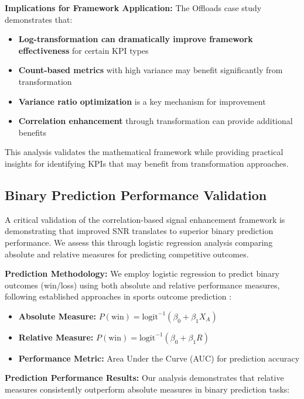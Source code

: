 \textbf{Implications for Framework Application:}
The Offloads case study demonstrates that:

\begin{itemize}
    \item \textbf{Log-transformation can dramatically improve framework effectiveness} for certain KPI types
    \item \textbf{Count-based metrics} with high variance may benefit significantly from transformation
    \item \textbf{Variance ratio optimization} is a key mechanism for improvement
    \item \textbf{Correlation enhancement} through transformation can provide additional benefits
\end{itemize}

This analysis validates the mathematical framework while providing practical insights for identifying KPIs that may benefit from transformation approaches.

\subsection{Binary Prediction Performance Validation}

A critical validation of the correlation-based signal enhancement framework is demonstrating that improved SNR translates to superior binary prediction performance. We assess this through logistic regression analysis comparing absolute and relative measures for predicting competitive outcomes.

\textbf{Prediction Methodology:}
We employ logistic regression to predict binary outcomes (win/loss) using both absolute and relative performance measures, following established approaches in sports outcome prediction \cite{dixon1997modelling, berrar2019incorporating}:

\begin{itemize}
    \item \textbf{Absolute Measure:} $P(\text{win}) = \text{logit}^{-1}(\beta_0 + \beta_1 X_A)$
    \item \textbf{Relative Measure:} $P(\text{win}) = \text{logit}^{-1}(\beta_0 + \beta_1 R)$
    \item \textbf{Performance Metric:} Area Under the Curve (AUC) for prediction accuracy
\end{itemize}

\textbf{Prediction Performance Results:}
Our analysis demonstrates that relative measures consistently outperform absolute measures in binary prediction tasks:

